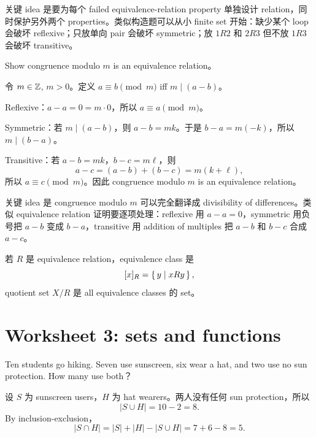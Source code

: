 \begin{explanation}
关键 idea 是要为每个 failed equivalence-relation property 单独设计 relation，同时保护另外两个 properties。类似构造题可以从小 finite set 开始：缺少某个 loop 会破坏 reflexive；只放单向 pair 会破坏 symmetric；放 \(1R2\) 和 \(2R3\) 但不放 \(1R3\) 会破坏 transitive。
\end{explanation}

\begin{exerciseblock}
Show congruence modulo \(m\) is an equivalence relation。
\end{exerciseblock}

\begin{solution}
令 \(m\in\mathbb{Z}\), \(m>0\)。定义 \(a\equiv b\pmod m\) iff \(m\mid(a-b)\)。

Reflexive：\(a-a=0=m\cdot0\)，所以 \(a\equiv a\pmod m\)。

Symmetric：若 \(m\mid(a-b)\)，则 \(a-b=mk\)。于是 \(b-a=m(-k)\)，所以 \(m\mid(b-a)\)。

Transitive：若 \(a-b=mk\)，\(b-c=m\ell\)，则
\[
a-c=(a-b)+(b-c)=m(k+\ell),
\]
所以 \(a\equiv c\pmod m\)。因此 congruence modulo \(m\) is an equivalence relation。
\end{solution}

\begin{explanation}
关键 idea 是 congruence modulo \(m\) 可以完全翻译成 divisibility of differences。类似 equivalence relation 证明要逐项处理：reflexive 用 \(a-a=0\)，symmetric 用负号把 \(a-b\) 变成 \(b-a\)，transitive 用 addition of multiples 把 \(a-b\) 和 \(b-c\) 合成 \(a-c\)。
\end{explanation}

若 \(R\) 是 equivalence relation，equivalence class 是
\[
[x]_R=\left\{\,y\mid xRy\,\right\},
\]
quotient set \(X/R\) 是 all equivalence classes 的 set。

\section{Worksheet 3: sets and functions}

\begin{exerciseblock}
Ten students go hiking. Seven use sunscreen, six wear a hat, and two use no sun protection. How many use both？
\end{exerciseblock}

\begin{solution}
设 \(S\) 为 sunscreen users，\(H\) 为 hat wearers。两人没有任何 sun protection，所以
\[
|S\cup H|=10-2=8.
\]
By inclusion-exclusion，
\[
|S\cap H|=|S|+|H|-|S\cup H|=7+6-8=5.
\]
\end{solution}

